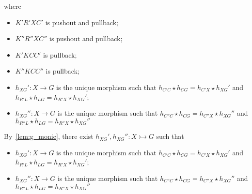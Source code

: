 \begin{lemma}
\begin{center}
    \end{center}
    where  
    \begin{itemize}
        \item $K'R'XC'$ is pushout and pullback;
        \item $K''R''XC''$ is pushout and pullback;
        \item $K'KCC'$ is pullback;
        \item $K''KCC''$ is pullback;
        \item $h_{XG}':X \to G$ is the unique morphism such that $h_{C'C} \star h_{CG} = h_{C'X} \star h_{XG}'$ and  $h_{R'L} \star h_{LG} = h_{R'X} \star h_{XG}'$;
        \item $h_{XG}'':X \to G$ is the unique morphism such that $h_{C''C} \star h_{CG} = h_{C''X} \star h_{XG}''$ and  $h_{R''L} \star h_{LG} = h_{R''X} \star h_{XG}''$
    \end{itemize}

    \noindent
    By~\autoref{lem:g_monic}, there exist
    $h_{XG}',h_{XG}'' : X \rightarrowtail G$
    such that 
    \begin{itemize}
        \item $h_{XG}':X \to G$ is the unique morphism such that $h_{C'C} \star h_{CG} = h_{C'X} \star h_{XG}'$ and  $h_{R'L} \star h_{LG} = h_{R'X} \star h_{XG}'$;
        \item $h_{XG}'':X \to G$ is the unique morphism such that $h_{C''C} \star h_{CG} = h_{C''X} \star h_{XG}''$ and  $h_{R''L} \star h_{LG} = h_{R''X} \star h_{XG}''$
    \end{itemize}


\end{lemma}
